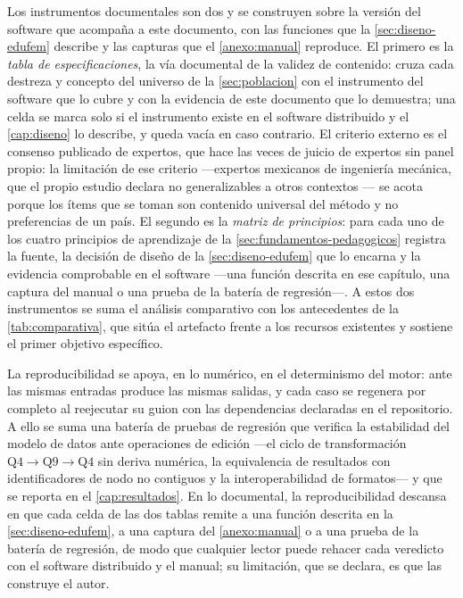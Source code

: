 Los instrumentos documentales son dos y se construyen sobre la versión del software que acompaña a este documento, con las funciones que la \autoref{sec:diseno-edufem} describe y las capturas que el \autoref{anexo:manual} reproduce. El primero es la \emph{tabla de especificaciones}, la vía documental de la validez de contenido: cruza cada destreza y concepto del universo de la \autoref{sec:poblacion} con el instrumento del software que lo cubre y con la evidencia de este documento que lo demuestra; una celda se marca solo si el instrumento existe en el software distribuido y el \autoref{cap:diseno} lo describe, y queda vacía en caso contrario. El criterio externo es el consenso publicado de expertos, que hace las veces de juicio de expertos sin panel propio: la limitación de ese criterio —expertos mexicanos de ingeniería mecánica, que el propio estudio declara no generalizables a otros contextos \autocite[p.~1171]{perezsantiago2023fem}— se acota porque los ítems que se toman son contenido universal del método y no preferencias de un país. El segundo es la \emph{matriz de principios}: para cada uno de los cuatro principios de aprendizaje de la \autoref{sec:fundamentos-pedagogicos} registra la fuente, la decisión de diseño de la \autoref{sec:diseno-edufem} que lo encarna y la evidencia comprobable en el software —una función descrita en ese capítulo, una captura del manual o una prueba de la batería de regresión—. A estos dos instrumentos se suma el análisis comparativo con los antecedentes de la \autoref{tab:comparativa}, que sitúa el artefacto frente a los recursos existentes y sostiene el primer objetivo específico.

La reproducibilidad se apoya, en lo numérico, en el determinismo del motor: ante las mismas entradas produce las mismas salidas, y cada caso se regenera por completo al reejecutar su guion con las dependencias declaradas en el repositorio. A ello se suma una batería de pruebas de regresión que verifica la estabilidad del modelo de datos ante operaciones de edición —el ciclo de transformación $\text{Q4}\rightarrow\text{Q9}\rightarrow\text{Q4}$ sin deriva numérica, la equivalencia de resultados con identificadores de nodo no contiguos y la interoperabilidad de formatos— y que se reporta en el \autoref{cap:resultados}. En lo documental, la reproducibilidad descansa en que cada celda de las dos tablas remite a una función descrita en la \autoref{sec:diseno-edufem}, a una captura del \autoref{anexo:manual} o a una prueba de la batería de regresión, de modo que cualquier lector puede rehacer cada veredicto con el software distribuido y el manual; su limitación, que se declara, es que las construye el autor.


